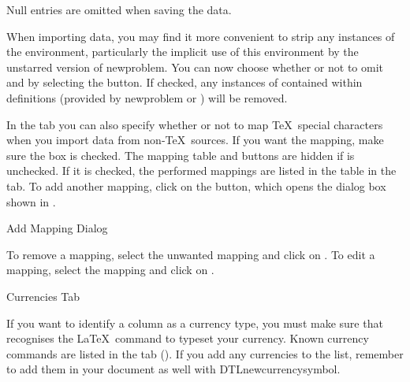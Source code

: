 \begin{information}
Null entries are omitted when saving the data.
\end{information}

When importing  data, you may find it more convenient
to strip any instances of the  environment, 
particularly the implicit use of this environment by the
unstarred version of \gls{newproblem}. You can now choose whether or 
not to omit  and 
by selecting the  button.
If checked, any instances of  contained within 
definitions (provided by \gls{newproblem} or ) 
will be removed.

In the  tab you can also specify whether or
not to map \TeX\ special characters when you import data from
non-\TeX\ sources.  If you want the mapping, make sure the
 box is checked. The mapping table and
buttons are hidden if  is unchecked. If
it is checked, the performed mappings are listed in the table in the
tab. To add another mapping, click on the
 button, which opens the dialog box
shown in . 

 {%
 }
 {Add Mapping Dialog}

    To remove a mapping, select the unwanted mapping and click on 
    . To edit a mapping,
    select the mapping and click on .


 {%
 }
 {Currencies Tab}


If you want to identify a column as a currency type, you 
must make sure that  recognises the \LaTeX\ command to typeset
your currency. Known currency commands are listed in the 
 tab (). If you add any currencies
to the list, remember to add them in your document as well with 
\gls{DTLnewcurrencysymbol}.


